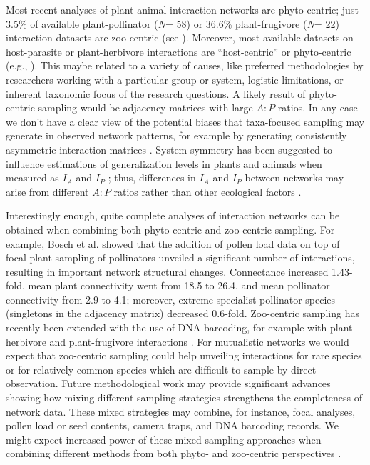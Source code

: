 \documentclass[12pt]{article}
\begin{document}
Most recent analyses of plant-animal interaction networks are phyto-centric; just 3.5\% of available plant-pollinator (\emph{N}= 58) or 36.6\% plant-frugivore (\emph{N}= 22) interaction datasets are zoo-centric (see \citep{Schleuning:2012eg}). Moreover, most available datasets on host-parasite or plant-herbivore interactions are ``host-centric'' or phyto-centric (e.g., \citep{Thebault:2010jv,Eklof:2013ed}). This maybe related to a variety of causes, like preferred methodologies by researchers working with a particular group or system, logistic limitations, or inherent taxonomic focus of the research questions. A likely result of phyto-centric sampling would be adjacency matrices with large $A:P$ ratios. In any case we don't have a clear view of the potential biases that taxa-focused sampling may generate in observed network patterns, for example by generating consistently asymmetric interaction matrices \citep{Dormann:2009aa}. System symmetry has been suggested to influence estimations of generalization levels in plants and animals when measured as $I_A$ and $I_P$ \citep{E31/5591}; thus, differences in $I_A$ and $I_P$ between networks may arise from different $A:P$ ratios rather than other ecological factors \citep{Olesen:2002wb}. 

Interestingly enough, quite complete analyses of interaction networks can be obtained when combining both phyto-centric and zoo-centric sampling. For example, Bosch et al. \citep{Bosch:2009jga} showed that the addition of pollen load data on top of focal-plant sampling of pollinators unveiled a significant number of interactions, resulting in important network structural changes. Connectance increased 1.43-fold, mean plant connectivity went from 18.5 to 26.4, and mean pollinator connectivity from 2.9 to 4.1; moreover, extreme specialist pollinator species (singletons in the adjacency matrix) decreased 0.6-fold. Zoo-centric sampling has recently been extended with the use of DNA-barcoding, for example with plant-herbivore \citep{JuradoRivera:2009cp} and plant-frugivore interactions \citep{GonzalezVaro:2014ij}. For mutualistic networks we would expect that zoo-centric sampling could help unveiling interactions for rare species or for relatively common species which are difficult to sample by direct observation. Future methodological work may provide significant advances showing how mixing different sampling strategies strengthens the completeness of network data. These mixed strategies may combine, for instance, focal analyses, pollen load or seed contents, camera traps, and DNA barcoding records. We might expect increased power of these mixed sampling approaches when combining different methods from both phyto- and zoo-centric perspectives \citep{Bosch:2009jga,Bluthgen:2010p9}.
\end{document}
